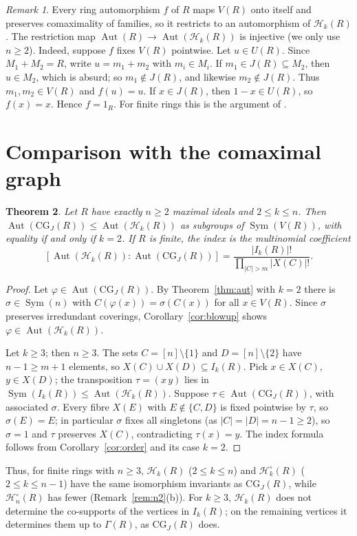 \documentclass{amsart}
\newtheorem{theorem}{Theorem}[section]
\theoremstyle{definition}
\theoremstyle{remark}
\newtheorem{remark}[theorem]{Remark}
\newcommand{\Aut}{\operatorname{Aut}}
\newcommand{\Sym}{\operatorname{Sym}}
\newcommand{\CG}{\mathrm{CG}_J}
\newcommand{\cH}{\mathcal{H}}
\newcommand{\nn}{[n]}
\begin{document}
\begin{remark}
Every ring automorphism $f$ of $R$ maps $V(R)$ onto itself and preserves comaximality of families, so it restricts to an automorphism of $\cH_k(R)$. The restriction map $\Aut(R)\to\Aut(\cH_k(R))$ is injective (we only use $n\ge2$). Indeed, suppose $f$ fixes $V(R)$ pointwise. Let $u\in U(R)$. Since $M_1+M_2=R$, write $u=m_1+m_2$ with $m_i\in M_i$. If $m_1\in J(R)\subseteq M_2$, then $u\in M_2$, which is absurd; so $m_1\notin J(R)$, and likewise $m_2\notin J(R)$. Thus $m_1,m_2\in V(R)$ and $f(u)=u$. If $x\in J(R)$, then $1-x\in U(R)$, so $f(x)=x$. Hence $f=1_R$. For finite rings this is the argument of \cite[Theorem~1.2]{KMR25}.
\end{remark}

\section{Comparison with the comaximal graph}\label{sec:compare}

\begin{theorem}\label{thm:compare}
Let $R$ have exactly $n\ge2$ maximal ideals and $2\le k\le n$. Then $\Aut(\CG(R))\le\Aut(\cH_k(R))$ as subgroups of $\Sym(V(R))$, with equality if and only if $k=2$. If $R$ is finite, the index is the multinomial coefficient
\[
[\Aut(\cH_k(R)):\Aut(\CG(R))]=\frac{|I_k(R)|!}{\prod_{|C|>m}|X(C)|!}.
\]
\end{theorem}

\begin{proof}
Let $\varphi\in\Aut(\CG(R))$. By Theorem~\ref{thm:aut} with $k=2$ there is $\sigma\in\Sym(n)$ with $C(\varphi(x))=\sigma(C(x))$ for all $x\in V(R)$. Since $\sigma$ preserves irredundant coverings, Corollary~\ref{cor:blowup} shows $\varphi\in\Aut(\cH_k(R))$.

Let $k\ge3$; then $n\ge 3$. The sets $C=\nn\setminus\{1\}$ and $D=\nn\setminus\{2\}$ have $n-1\ge m+1$ elements, so $X(C)\cup X(D)\subseteq I_k(R)$. Pick $x\in X(C)$, $y\in X(D)$; the transposition $\tau=(x\,y)$ lies in $\Sym(I_k(R))\le\Aut(\cH_k(R))$. Suppose $\tau\in\Aut(\CG(R))$, with associated $\sigma$. Every fibre $X(E)$ with $E\notin\{C,D\}$ is fixed pointwise by $\tau$, so $\sigma(E)=E$; in particular $\sigma$ fixes all singletons (as $|C|=|D|=n-1\ge2$), so $\sigma=1$ and $\tau$ preserves $X(C)$, contradicting $\tau(x)=y$. The index formula follows from Corollary~\ref{cor:order} and its case $k=2$.
\end{proof}

Thus, for finite rings with $n\ge3$, $\cH_k(R)$ ($2\le k\le n$) and $\cH_k^\circ(R)$ ($2\le k\le n-1$) have the same isomorphism invariants as $\CG(R)$, while $\cH_n^\circ(R)$ has fewer (Remark~\ref{rem:n2}(b)). For $k\ge3$, $\cH_k(R)$ does not determine the co-supports of the vertices in $I_k(R)$; on the remaining vertices it determines them up to $\Gamma(R)$, as $\CG(R)$ does.
\end{document}
